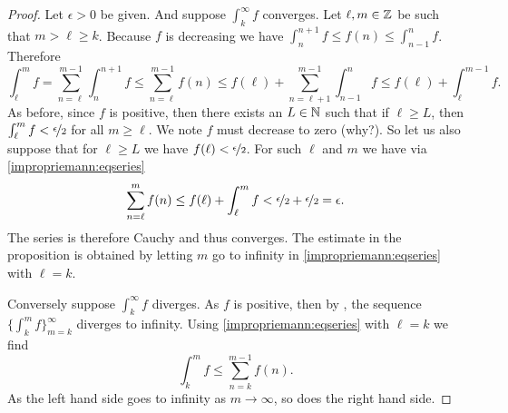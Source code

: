 \begin{proof}
Let $\epsilon > 0$ be given.  And suppose $\int_k^\infty f$ converges.
Let $\ell, m \in {\mathbb{Z}}$ be such that $m > \ell \geq k$.
Because $f$ is decreasing we have
$\int_{n}^{n+1} f \leq f(n) \leq \int_{n-1}^{n} f$.  Therefore
\begin{equation} \label{impropriemann:eqseries}
\int_\ell^m f
=
\sum_{n=\ell}^{m-1} \int_{n}^{n+1} f
\leq
\sum_{n=\ell}^{m-1} f(n)
\leq
f(\ell) +
\sum_{n=\ell+1}^{m-1} \int_{n-1}^{n} f
\leq
f(\ell)+
\int_\ell^{m-1} f .
\end{equation}
As before, since $f$ is positive, then there exists
an $L \in {\mathbb{N}}$ such that if $\ell \geq L$, then
$\int_\ell^{m} f < \nicefrac{\epsilon}{2}$ for all $m \geq \ell$.
We note 
$f$ must decrease to zero (why?).  So let us also suppose
that for $\ell \geq L$ we have $f(\ell) < \nicefrac{\epsilon}{2}$.
For such $\ell$ and $m$ we have via \eqref{impropriemann:eqseries}
\begin{equation*}
\sum_{n=\ell}^{m} f(n)
\leq
f(\ell)+
\int_\ell^{m} f < \nicefrac{\epsilon}{2} + \nicefrac{\epsilon}{2} = \epsilon .
\end{equation*}
The series is therefore Cauchy and thus converges.  The estimate in the
proposition is obtained by letting $m$ go to infinity in
\eqref{impropriemann:eqseries} with $\ell = k$.

Conversely suppose $\int_k^\infty f$ diverges.  
As $f$ is positive, then by
,
the sequence $\{ \int_k^m f \}_{m=k}^\infty$ diverges to infinity.
Using
\eqref{impropriemann:eqseries} with $\ell = k$ we find
\begin{equation*}
\int_k^m f
\leq
\sum_{n=k}^{m-1} f(n) .
\end{equation*}
As the left hand side goes to infinity as $m \to \infty$, so does the right
hand side.
\end{proof}

